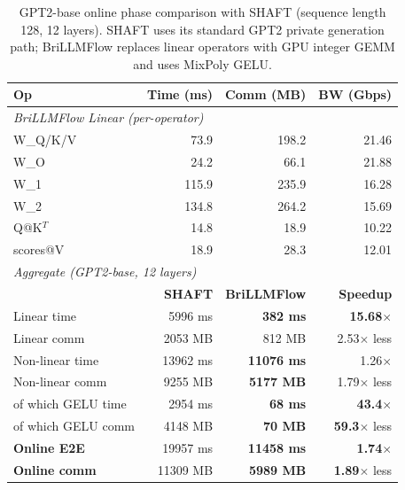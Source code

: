 \begin{table}[t]
\centering
\caption{GPT2-base online phase comparison with SHAFT (sequence length 128, 12 layers). SHAFT uses its standard GPT2 private generation path; BriLLMFlow replaces linear operators with GPU integer GEMM and uses MixPoly GELU.}
\label{tab:gpt2_shaft_comparison}
\setlength{\tabcolsep}{4pt}
\footnotesize
\begin{tabular}{lrrr}
\toprule
\textbf{Op} & \textbf{Time (ms)} & \textbf{Comm (MB)} & \textbf{BW (Gbps)} \\
\midrule
\multicolumn{4}{l}{\textit{BriLLMFlow Linear (per-operator)}} \\
W\_Q/K/V    & 73.9 & 198.2 & 21.46 \\
W\_O        & 24.2 & 66.1 & 21.88 \\
W\_1        & 115.9 & 235.9 & 16.28 \\
W\_2        & 134.8 & 264.2 & 15.69 \\
Q@K$^T$     & 14.8 & 18.9 & 10.22 \\
scores@V    & 18.9 & 28.3 & 12.01 \\
\midrule
\multicolumn{4}{l}{\textit{Aggregate (GPT2-base, 12 layers)}} \\
                       & \textbf{SHAFT} & \textbf{BriLLMFlow} & \textbf{Speedup} \\
Linear time            & 5996 ms & \textbf{382 ms} & \textbf{15.68}$\times$ \\
Linear comm            & 2053 MB & 812 MB & 2.53$\times$ less \\
Non-linear time        & 13962 ms & \textbf{11076 ms} & 1.26$\times$ \\
Non-linear comm        & 9255 MB & \textbf{5177 MB} & 1.79$\times$ less \\
\quad of which GELU time & 2954 ms & \textbf{68 ms} & \textbf{43.4}$\times$ \\
\quad of which GELU comm & 4148 MB & \textbf{70 MB} & \textbf{59.3}$\times$ less \\
\midrule
\textbf{Online E2E}    & 19957 ms & \textbf{11458 ms} & \textbf{1.74}$\times$ \\
\textbf{Online comm}   & 11309 MB & \textbf{5989 MB} & \textbf{1.89}$\times$ less \\
\bottomrule
\end{tabular}
\end{table}

